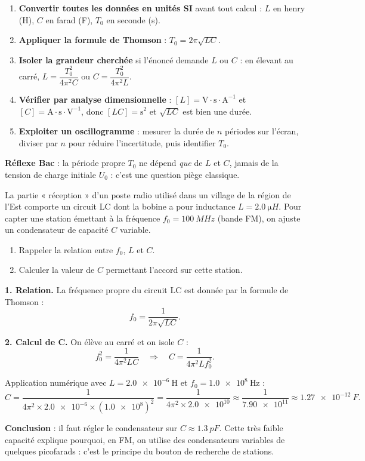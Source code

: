 \documentclass[11pt]{article}
\begin{document}
\begin{methode}
\begin{enumerate}
\item \textbf{Convertir toutes les données en unités SI} avant tout calcul : $L$ en henry (H), $C$ en farad (F), $T_0$ en seconde (s).
\item \textbf{Appliquer la formule de Thomson} : $T_0 = 2\pi\sqrt{LC}$.
\item \textbf{Isoler la grandeur cherchée} si l'énoncé demande $L$ ou $C$ : en élevant au carré, $L = \dfrac{T_0^2}{4\pi^2 C}$ ou $C = \dfrac{T_0^2}{4\pi^2 L}$.
\item \textbf{Vérifier par analyse dimensionnelle} : $[L] = \text{V}\cdot\text{s}\cdot\text{A}^{-1}$ et $[C] = \text{A}\cdot\text{s}\cdot\text{V}^{-1}$, donc $[LC] = \text{s}^2$ et $\sqrt{LC}$ est bien une durée.
\item \textbf{Exploiter un oscillogramme} : mesurer la durée de $n$ périodes sur l'écran, diviser par $n$ pour réduire l'incertitude, puis identifier $T_0$.
\end{enumerate}
\textbf{Réflexe Bac} : la période propre $T_0$ ne dépend \emph{que} de $L$ et $C$, jamais de la tension de charge initiale $U_0$ : c'est une question piège classique.
\end{methode}

\begin{exoresolu}
La partie « réception » d'un poste radio utilisé dans un village de la région de l'Est comporte un circuit LC dont la bobine a pour inductance $L = \SI{2,0}{\micro H}$. Pour capter une station émettant à la fréquence $f_0 = \SI{100}{MHz}$ (bande FM), on ajuste un condensateur de capacité $C$ variable.
\begin{enumerate}
\item Rappeler la relation entre $f_0$, $L$ et $C$.
\item Calculer la valeur de $C$ permettant l'accord sur cette station.
\end{enumerate}
\tcblower
\textbf{1. Relation.} La fréquence propre du circuit LC est donnée par la formule de Thomson :
\[ f_0 = \frac{1}{2\pi\sqrt{LC}}. \]

\textbf{2. Calcul de C.} On élève au carré et on isole $C$ :
\[ f_0^2 = \frac{1}{4\pi^2 LC} \quad \Longrightarrow \quad C = \frac{1}{4\pi^2 L f_0^2}. \]

Application numérique avec $L = \num{2,0e-6}\ \text{H}$ et $f_0 = \num{1,0e8}\ \text{Hz}$ :
\[ C = \frac{1}{4\pi^2 \times \num{2,0e-6}\times (\num{1,0e8})^2} = \frac{1}{4\pi^2 \times \num{2,0e10}} \approx \frac{1}{\num{7,90e11}} \approx \SI{1,27e-12}{F}. \]

\textbf{Conclusion} : il faut régler le condensateur sur $C \approx \SI{1,3}{pF}$. Cette très faible capacité explique pourquoi, en FM, on utilise des condensateurs variables de quelques picofarads : c'est le principe du bouton de recherche de stations.
\end{exoresolu}
\end{document}
